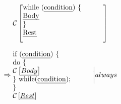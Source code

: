 \documentclass[12pt]{article}
\begin{document}
\begin{equation}
\mathcal{C} \left[
\parbox{4cm}{
while (\emph{condition}) \{\\
	\emph{Body}\\
\}\\
\emph{Rest}\\
}
\right]
\end{equation}

\begin{equation}
\Rightarrow \parbox{4cm}{
if (\emph{condition}) \{\\
	do \{\\
		$\mathcal{C} \left[ \emph{Body} \right]$ \\
	\} while(\emph{condition});\\
\}\\
$\mathcal{C} \left[ \emph{Rest} \right]$
}
\bigg| always
\end{equation}
\end{document}
